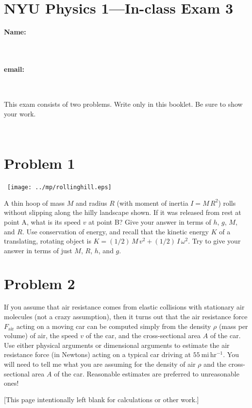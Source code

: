 \documentclass[12pt]{article}
\begin{document}
\section*{NYU Physics 1---In-class Exam 3}

\vfill

\paragraph{Name:} ~

\paragraph{email:} ~

\vfill

This exam consists of two problems.  Write only in this booklet.  Be
sure to show your work.

\vfill ~

\clearpage

\section*{Problem 1}

\noindent~\hfill\texttt{[image: ../mp/rollinghill.eps]}\hfill~

A thin hoop of mass $M$ and radius $R$ (with moment of inertia
$I=M\,R^2$) rolls without slipping along the hilly landscape shown.
If it was released from rest at point A, what is its speed $v$ at
point B?  Give your answer in terms of $h$, $g$, $M$, and $R$.  Use
conservation of energy, and recall that the kinetic energy $K$ of a
translating, rotating object is $K=(1/2)\,M\,v^2+(1/2)\,I\,\omega^2$.
Try to give your answer in terms of just $M$, $R$, $h$, and $g$.

\clearpage

\section*{Problem 2}

If you assume that air resistance comes from elastic collisions with
stationary air molecules (not a crazy assumption), then it turns out
that the air resistance force $F_\mathrm{air}$ acting on a moving car
can be computed simply from the density $\rho$ (mass per volume) of
air, the speed $v$ of the car, and the cross-sectional area $A$ of the
car.  Use either physical arguments or dimensional arguments to
estimate the air resistance force (in Newtons) acting on a typical car
driving at $55~\mathrm{mi\,hr^{-1}}$.  You will need to tell me what
you are assuming for the density of air $\rho$ and the cross-sectional
area $A$ of the car.  Reasonable estimates are preferred to
unreasonable ones!

\clearpage

[This page intentionally left blank for calculations or other work.]
\end{document}
